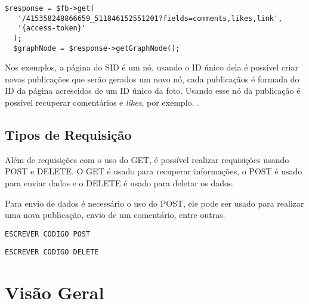 \begin{lstlisting}[caption={Requsição de diversos atributos},label={lst:requisicao8}]
  $response = $fb->get(
   '/415358248866659_511846152551201?fields=comments,likes,link', 
   '{access-token}'
  );
  $graphNode = $response->getGraphNode();
\end{lstlisting}

Nos exemplos, a página do SID é um nó, usando o ID único dela é possível criar novas publicações que serão gerados um novo nó, cada publicaçãos é formada do ID da página acrescidos de um ID único da foto. Usando esse nó da publicação é possível recuperar comentários e \textit{likes}, por exemplo. \cite{facebook2018b}.

\subsection{Tipos de Requisição}
Além de requisições com o uso do GET, é possível realizar requisições usando POST e DELETE. O GET é usado para recuperar informações, o POST é usado para enviar dados e o DELETE é usado para deletar os dados.

Para envio de dados é necessário o uso do POST, ele pode ser usado para realizar uma nova publicação, envio de um comentário, entre outras.
\begin{lstlisting}[caption={Requsição de diversos atributos},label={lst:requisicao9}]
ESCREVER CODIGO POST
\end{lstlisting}

\begin{lstlisting}[caption={Requsição de diversos atributos},label={lst:requisicao10}]
ESCREVER CODIGO DELETE
\end{lstlisting}

\section{Visão Geral}

